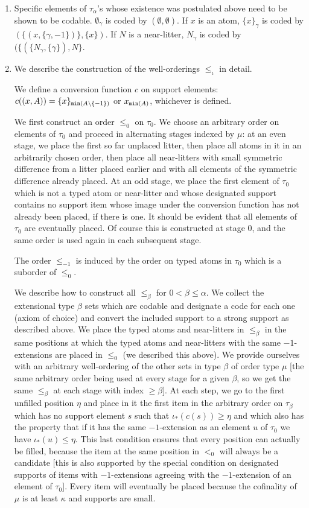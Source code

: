 \documentclass[12pt]{article}
\begin{document}
\begin{enumerate}
\item Specific elements of $\tau_\alpha$'s whose existence was postulated above need to be shown to be codable.  $\emptyset_\gamma$ is coded by $(\emptyset,\emptyset)$.  If $x$ is an atom, $\{x\}_\gamma$ is coded by $(\{(x,\{\gamma,-1\})\},\{x\})$.  If $N$ is a near-litter,
$N_\gamma$ is coded by $(\{(\{N_\gamma,\{\gamma\}),N\}$.

\item  We describe the construction of the well-orderings $\leq_\iota$ in detail.

We define a conversion function $c$ on support elements:  $c((x,A)) = \{x\}_{{\tt min}(A\setminus \{-1\})}$ or $x_{{\tt min}(A)}$, whichever is defined.

We first construct an order $\leq_0$  on $\tau_0$.  We choose an arbitrary order on elements of $\tau_0$ and proceed in alternating stages indexed by $\mu$:  at an even stage, we place the first so far unplaced litter, then place all atoms in it in an arbitrarily chosen order, then place all near-litters with small symmetric difference from a litter placed earlier and with all elements of the symmetric difference already placed.  At an odd stage, we place the first element of $\tau_0$ which is not a typed atom or near-litter and whose designated support contains no support item whose image under the conversion function has not already been placed, if there is one.  It should be evident that all elements of $\tau_0$ are eventually placed.  Of course this is constructed
at stage 0, and the same order is used again in each subsequent stage.

The order $\leq_{-1}$
is induced by the order on typed atoms in $\tau_0$ which is a suborder of $\leq_0$.



We describe how to construct all $\leq_\beta$ for $0<\beta \leq \alpha$.  We collect the extensional type $\beta$ sets which are codable and designate a code for each one (axiom of choice) and convert the included support to a strong support as described above. We place the typed atoms and near-litters  in $\leq_\beta$ in the same positions at which the typed atoms and near-litters with the same $-1$-extensions are placed in
$\leq_0$ (we described this above).  We provide ourselves with an arbitrary well-ordering of the other sets in type $\beta$ of order type $\mu$ [the same arbitrary order being used at every stage for a given $\beta$, so we get the same $\leq_\beta$ at each stage with index $\geq\beta$].  At each step, we go to the first unfilled position $\eta$ and place in it the first item in the arbitrary order on $\tau_\beta$ which has no support element $s$ such that $\iota_*(c(s))\geq \eta$ and which also has the property that
if it has the same $-1$-extension as an element $u$ of $\tau_0$ we have $\iota_*(u) \leq \eta$.  This last condition ensures that every position can actually be filled, because the item at the same position in $<_0$ will always be a candidate [this is also supported by the special condition on designated supports of items with $-1$-extensions agreeing with the $-1$-extension of an element of $\tau_0$].  Every item will eventually be placed because the cofinality of $\mu$ is at least $\kappa$ and supports are small.


\end{enumerate}
\end{document}
